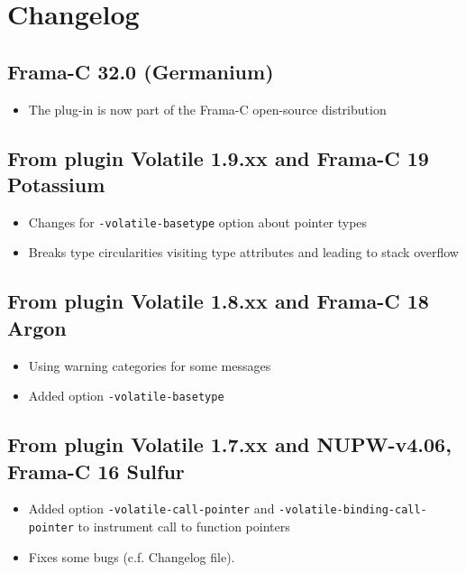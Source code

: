\chapter*{Changelog}


\section*{Frama-C 32.0 (Germanium)}
\begin{itemize}
\item The plug-in is now part of the Frama-C open-source distribution
\end{itemize}

\section*{From plugin Volatile 1.9.xx and Frama-C 19 Potassium}
\begin{itemize}
\item Changes for \texttt{-volatile-basetype} option about pointer types
\item Breaks type circularities visiting type attributes and leading to stack overflow
\end{itemize}

\section*{From plugin Volatile 1.8.xx and Frama-C 18 Argon}
\begin{itemize}
\item Using warning categories for some messages
\item Added option \texttt{-volatile-basetype}
\end{itemize}

\section*{From plugin Volatile 1.7.xx and NUPW-v4.06, Frama-C 16 Sulfur}
\begin{itemize}
\item Added option \texttt{-volatile-call-pointer} and \texttt{-volatile-binding-call-pointer} to instrument call to function pointers
\item Fixes some bugs (c.f. Changelog file).
\end{itemize}


